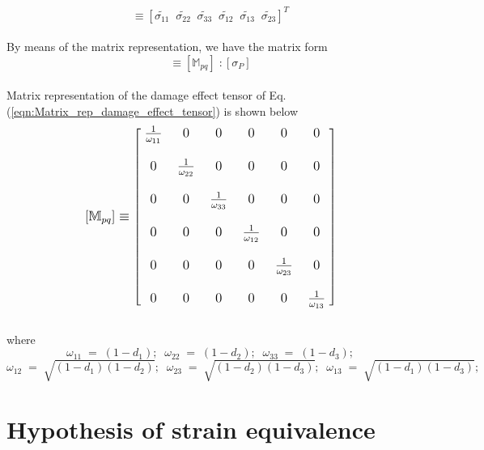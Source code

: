 \documentclass[12pt,a4paper,twoside,openright]{report}
\begin{document}
\begin{equation}
   [\tilde{\sigma}_{P}]  \equiv  [\tilde{\sigma_{11}} \;\; \tilde{\sigma_{22}} \;\;\tilde{\sigma_{33}} \;\;\tilde{\sigma_{12}} \;\;\tilde{\sigma_{13}} \;\;\tilde{\sigma_{23}} ]^{T}
\end{equation}
\\
By means of the matrix representation, we have the matrix form
\begin{equation}
[\tilde{\sigma_{P}}] \equiv [\mathbb{M}_{pq}]\;: [\sigma_{P}]
\label{eqn:Matrix_rep_damage_effect_tensor}
\end{equation}
\\
Matrix representation of the damage effect tensor of Eq. (\ref{eqn:Matrix_rep_damage_effect_tensor}) is shown below \citep{wang2009three}
\\
$$
\mathlarger{ [\mathbb{M}_{pq}] \equiv   
 \begin{bmatrix}
   \; \frac{1}{\omega_{11}}  \; & 0 \; & 0 \; & 0 \; & 0\; & 0  \;\\
  \\
   \;0\; & \frac{1}{\omega_{22}}\; & 0\; & 0\; & 0\; & 0  \;\\
  \\
  \; 0\; & 0 \; & \frac{1}{\omega_{33}}\; & 0\; & 0\; & 0 \; \\
  \\
   \; 0\; & 0\; & 0\; & \frac{1}{\omega_{12}}\; & 0\; & 0  \;\\
  \\
   \; 0\; & 0\; & 0\; & 0\; & \frac{1}{\omega_{23}}\; & 0  \;\\
  \\
   \; 0\; & 0\; & 0\; & 0\; & 0\; & \frac{1}{\omega_{13}}  \; 
  \\
 \end{bmatrix}}
 \label{Damage_effect_tensor}
 $$
\\
where
$$\omega_{11} \; = \; (1 - d_{1}); \;\;  \omega_{22} \; = \; (1 - d_{2}); \;\; \omega_{33} \; = \; (1 - d_{3});$$ \vspace*{0.1cm} $$\omega_{12} \; = \; \sqrt{(1 - d_{1})(1 - d_{2})};  \;\;\omega_{23} \; = \; \sqrt{(1 - d_{2})(1 - d_{3})}; \;\; \omega_{13} \; = \; \sqrt{(1 - d_{1})(1 - d_{3})};$$

\section{Hypothesis of strain equivalence}\label{Hypothesis of Strain Equivalence}
\end{document}
